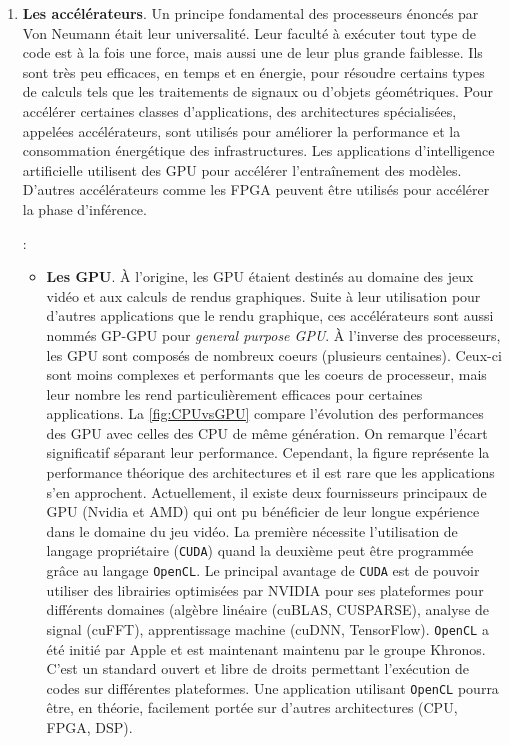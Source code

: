 \begin{enumerate}
            \item \textbf{Les accélérateurs}. Un principe fondamental des processeurs énoncés par Von Neumann était leur universalité. Leur faculté à exécuter tout type de code est à la fois une force, mais aussi une de leur plus grande faiblesse. Ils sont très peu efficaces, en temps et en énergie, pour résoudre certains types de calculs tels que les traitements de signaux ou d'objets géométriques. Pour accélérer certaines classes d'applications, des architectures spécialisées, appelées accélérateurs, sont utilisés pour améliorer la performance et la consommation énergétique des infrastructures. Les applications d'intelligence artificielle utilisent des \gls{GPU} pour accélérer l'entraînement des modèles. D'autres accélérateurs comme les \gls{FPGA} peuvent être utilisés pour accélérer la phase d'inférence.
            
            :
                \begin{itemize}
    
                    \item\textbf{Les GPU}. À l'origine, les \gls{GPU} étaient destinés au domaine des jeux vidéo et aux calculs de rendus graphiques. Suite à leur utilisation pour d'autres applications que le rendu graphique, ces accélérateurs sont aussi nommés GP-GPU pour \textit{general purpose GPU}. À l'inverse des processeurs, les GPU sont composés de nombreux coeurs (plusieurs centaines). Ceux-ci sont moins complexes et performants que les coeurs de processeur, mais leur nombre les rend particulièrement efficaces pour certaines applications. La \autoref{fig:CPUvsGPU} compare l'évolution des performances des GPU avec celles des CPU de même génération. On remarque l'écart significatif séparant leur performance. Cependant, la figure représente la performance théorique des architectures et il est rare que les applications s'en approchent. 
                    Actuellement, il existe deux fournisseurs principaux de GPU (Nvidia et AMD) qui ont pu bénéficier de leur longue expérience dans le domaine du jeu vidéo. La première nécessite l'utilisation de langage propriétaire (\verb|CUDA|) quand la deuxième peut être programmée grâce au langage \verb|OpenCL|. Le principal avantage de \verb|CUDA| est de pouvoir utiliser des librairies optimisées par NVIDIA pour ses plateformes pour différents domaines (algèbre linéaire (cuBLAS, CUSPARSE), analyse de signal (cuFFT), apprentissage machine (cuDNN, TensorFlow). 
                    \verb|OpenCL| a été initié par Apple et est maintenant maintenu par le groupe Khronos. C'est un standard ouvert et libre de droits permettant l'exécution de codes sur différentes plateformes. Une application utilisant \verb|OpenCL| pourra être, en théorie, facilement portée sur d'autres architectures (CPU, FPGA, DSP). 
                    

\end{itemize}
\end{enumerate}
